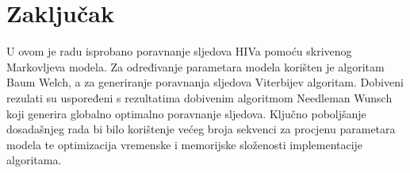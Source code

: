 \documentclass[times, utf8, seminar, numeric]{fer}
\begin{document}
\chapter{Zaključak}
U ovom je radu isprobano poravnanje sljedova HIVa pomoću skrivenog Markovljeva modela. Za određivanje parametara modela korišten je algoritam Baum Welch, a za generiranje poravnanja sljedova Viterbijev algoritam. Dobiveni rezulati su uspoređeni s rezultatima dobivenim algoritmom Needleman Wunsch koji generira globalno optimalno poravnanje sljedova. Ključno poboljšanje dosadašnjeg rada bi bilo korištenje većeg broja sekvenci za procjenu parametara modela te optimizacija vremenske i memorijske složenosti implementacije algoritama.
 
\nocite{*}


\end{document}
